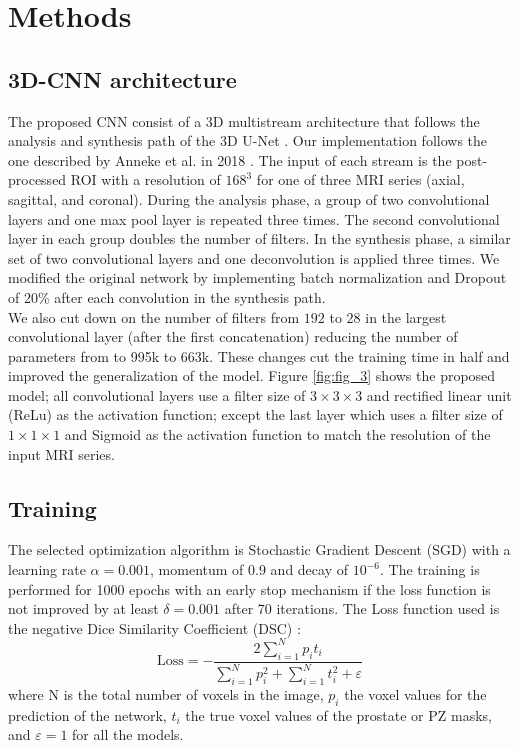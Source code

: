 \section{Methods}
\label{sec:methods}




\subsection{3D-CNN architecture}
The proposed CNN consist of a 3D multistream architecture that follows the analysis and synthesis path of the 3D U-Net \cite{cciccek20163d}. Our implementation follows the one described by Anneke et al. in 2018  \cite{anneke}. The input of each stream is the post-processed ROI with a resolution of $168^3$ for one of three MRI series (axial, sagittal, and coronal). During the analysis phase, a group of two convolutional layers and one max pool layer is repeated three times. The second convolutional layer in each group doubles the number of filters.  In the synthesis phase, a similar set of two convolutional layers and one deconvolution is applied three times. We modified the original network by implementing batch normalization \cite{ioffe2015batch} and Dropout of 20\%  \cite{hinton2012improving} after each convolution in the synthesis path.\\

We also cut down on the number of filters from $192$ to $28$ in the largest convolutional layer (after the first concatenation) reducing the number of parameters from to 995k to 663k. These changes cut the training time in half and improved the generalization of the  model. Figure \ref{fig:fig_3} shows the proposed model; all convolutional layers use a filter size of $3 \times 3 \times 3$ and rectified linear unit (ReLu) as the activation function; except the last layer which uses a filter size of $1 \times 1 \times 1$ and Sigmoid as the activation function to match the resolution of the input MRI series.

\subsection{Training}
\label{subsec:training}
The selected optimization algorithm is Stochastic Gradient Descent (SGD) with a learning rate $\alpha = 0.001$, momentum of 0.9 and decay of $10^{-6}$. The training is performed for 1000 epochs with an early stop mechanism if the loss function is not improved by at least $\delta = 0.001$ after 70 iterations. The Loss function used is the negative Dice Similarity Coefficient (DSC) \cite{dice1945measures}:  
\begin{equation}
\text{Loss} = - \frac{2 \sum_{i=1}^{N}p_it_i}{\sum_{i=1}^{N}p_i^2 + \sum_{i=1}^{N}t_i^2 + \varepsilon} 
\label{eq:dsc}
\end{equation}
where N is the total number of voxels in the image, $p_i$ the voxel values for the prediction of the network, $t_i$ the true voxel values of the prostate or PZ masks, and $\varepsilon = 1$ for all the models.

